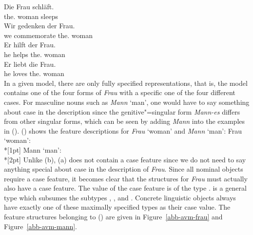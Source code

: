 \eal\settowidth{}
\ex 
\gll Die        Frau schläft. \\      
     the.\nom{} woman sleeps\\
\ex 
\gll Wir gedenken der Frau. \\ 
     we commemorate the.\gen{} woman\\
\ex 
\gll Er hilft der Frau.  \\    
     he helps the.\dat{} woman\\
\ex 
\gll Er liebt die Frau.   \\   
     he loves the.\acc{} woman\\
\zl
In a given model, there are only fully specified representations, that is, the model contains one of
the four forms of \emph{Frau} with a specific one of the four different cases.
For masculine nouns such as \emph{Mann} `man', one would have to say something about case in the description since the genitive"=singular form \emph{Mann-es}
differs from other singular forms, which can be seen by adding \emph{Mann} into the examples in (). () shows the feature descriptions for
\emph{Frau} `woman' and \emph{Mann} `man':
\eal
\ex\label{avm-frau}
Frau `woman':\\*[1pt]
\ex\label{avm-mann}
Mann `man':\\*[2pt]
\zl
\addlines
Unlike (b), (a) does not contain a case feature since we do not need to say anything special about case in the description of \emph{Frau}.
Since all nominal objects require a case feature, it becomes clear that the structures for \emph{Frau} must actually also have a case feature.
The value of the case feature is of the type .  is a general type which subsumes the subtypes , ,
 and . Concrete linguistic objects always have exactly one of these maximally specified types as their case value. The feature structures
belonging to () are given in Figure~\ref{abb-avm-frau} and Figure~\ref{abb-avm-mann}.%

